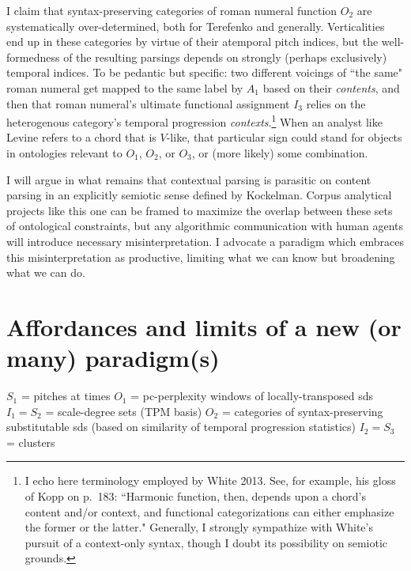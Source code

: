 I claim that syntax-preserving categories of roman numeral function $O_2$ are systematically over-determined, both for Terefenko and generally.  Verticalities end up in these categories by virtue of their atemporal pitch indices, but the well-formedness of the resulting parsings depends on strongly (perhaps exclusively) temporal indices.  To be pedantic but specific: two different voicings of ``the same" roman numeral get mapped to the same label by $A_1$ based on their \emph{contents}, and then that roman numeral's ultimate functional assignment $I_3$ relies on the heterogenous category's temporal progression \emph{contexts}.\footnote{I echo here terminology employed by White 2013.  See, for example, his gloss of Kopp on p.\ 183: ``Harmonic function, then, depends upon a chord's content and/or context, and functional categorizations can either emphasize the former or the latter."  Generally, I strongly sympathize with White's pursuit of a context-only syntax, though I doubt its possibility on semiotic grounds.}  When an analyst like Levine refers to a chord that is $V$-like, that particular sign could stand for objects in ontologies relevant to $O_1$, $O_2$, or $O_3$, or (more likely) some combination.

I will argue in what remains that contextual parsing is parasitic on content parsing in an explicitly semiotic sense defined by Kockelman.  Corpus analytical projects like this one can be framed to maximize the overlap between these sets of ontological constraints, but any algorithmic communication with human agents will introduce necessary misinterpretation.  I advocate a paradigm which embraces this misinterpretation as productive, limiting what we can know but broadening what we can do.

\section{Affordances and limits of a new (or many) paradigm(s)}

$S_1$ = pitches at times
$O_1$ = pc-perplexity windows of locally-transposed sds
$I_1 = S_2$ = scale-degree sets (TPM basis)
$O_2$ = categories of syntax-preserving substitutable sds (based on similarity of temporal progression statistics)
$I_2 = S_3$ = clusters

